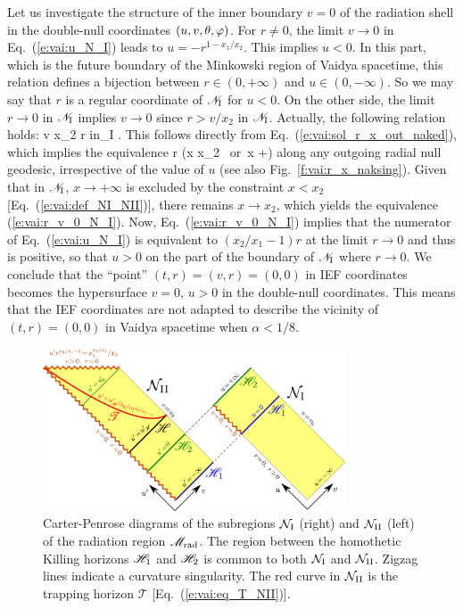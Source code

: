 Let us investigate the structure of the inner boundary $v=0$ of the radiation
shell in the double-null coordinates $(u, v, \theta, \varphi)$. For $r\neq 0$,
the limit $v\to 0$ in Eq.~(\ref{e:vai:u_N_I}) leads to $u = - r^{1 - x_1/x_2}$.
This implies $u < 0$. In this part, which is the future boundary of the Minkowski
region of Vaidya spacetime, this relation defines a bijection between
$r\in(0,+\infty)$ and $u\in(0, -\infty)$. So we may say that $r$ is a regular
coordinate of $\mathscr{N}_{\rm I}$ for $u < 0$. On the other side,
the limit $r\to 0$ in $\mathscr{N}_{\rm I}$ implies $v\to 0$ since $r > v /x_2$
in $\mathscr{N}_{\rm I}$. Actually, the following relation holds:
\be \label{e:vai:r_v_0_N_I}
    v  x_2 r \quad\mbox{in}\quad {}_{\rm I} .
\ee
This follows directly from Eq.~(\ref{e:vai:sol_r_x_out_naked}), which implies
the equivalence
\be \label{e:vai:r_to_0_outgoing}
    r \iff (x \to x_2 \ \mbox{or}\  x \to +\infty)
\ee
along any outgoing radial null geodesic, irrespective
of the value of $u$ (see also Fig.~\ref{f:vai:r_x_naksing}).
Given that in $\mathscr{N}_{\rm I}$, $x \to +\infty$ is excluded
by the constraint $x < x_2$ [Eq.~(\ref{e:vai:def_NI_NII})], there remains $x\to x_2$,
which yields the equivalence (\ref{e:vai:r_v_0_N_I}).
Now, Eq.~(\ref{e:vai:r_v_0_N_I}) implies that the numerator of Eq.~(\ref{e:vai:u_N_I})
is equivalent to $(x_2/x_1 - 1) r$ at the limit $r\to 0$ and thus
is positive, so that $u > 0$ on the part of the boundary of $\mathscr{N}_{\rm I}$
where $r\to 0$.
We conclude that the ``point'' $(t,r) = (v,r) = (0,0)$ in IEF coordinates
becomes the hypersurface $v = 0$, $u > 0$ in the double-null coordinates. This means
that the IEF coordinates are not adapted to describe the vicinity of $(t,r) = (0,0)$
in Vaidya spacetime when $\alpha < 1/8$.

\begin{figure}
\centerline{\includegraphics[width=0.8\textwidth]{vai_CPdiag_NI_NII.pdf}}
\caption[]{\label{f:vai:CPdiag_NI_NII} \footnotesize
Carter-Penrose diagrams of the subregions $\mathcal{N}_{\rm I}$ (right) and
$\mathcal{N}_{\rm II}$ (left) of the radiation region $\mathscr{M}_{\rm rad}$. The region
between the homothetic Killing horizons $\mathscr{H}_1$ and $\mathscr{H}_2$ is common to
both $\mathcal{N}_{\rm I}$ and $\mathcal{N}_{\rm II}$.
Zigzag lines indicate a curvature singularity. The red curve in $\mathcal{N}_{\rm II}$
is the trapping horizon $\mathscr{T}$ [Eq.~(\ref{e:vai:eq_T_NII})].
}
\end{figure}

